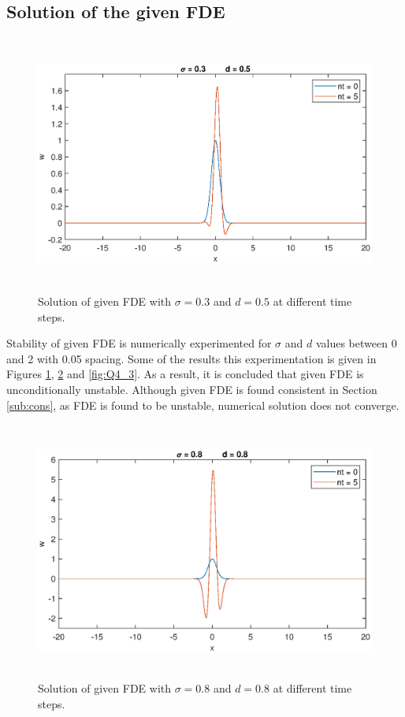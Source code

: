 \documentclass[letterpaper,12pt]{article}
\begin{document}
\subsection{Solution of the given FDE}

\begin{figure}[!h] 
	\centering 
	\includegraphics[max height=8.5cm]{graphs/Question4/sigma03d05.eps}
	\caption{Solution of given FDE with $\sigma= 0.3$ and $d=0.5$ at different time steps.}
	\label{fig:Q4_1}
\end{figure}

 \vspace{1cm}

 Stability of given FDE is numerically experimented for $\sigma$ and $d$ values between 0 and 2 with 0.05 spacing. 
 Some of the results this experimentation is given in Figures \ref{fig:Q4_1}, \ref{fig:Q4_2} and \ref{fig:Q4_3}. 
 As a result, it is concluded that given FDE is unconditionally unstable. Although given FDE is found consistent 
 in Section \ref{sub:cons}, as FDE is found to be unstable, numerical solution does not converge.
\newpage

\begin{figure}[!h] 
	\centering 
	\includegraphics[max height=8.5cm]{graphs/Question4/sigma08d08.eps}
	\caption{Solution of given FDE with $\sigma= 0.8$ and $d=0.8$ at different time steps.}
	\label{fig:Q4_2}
\end{figure}
\end{document}
